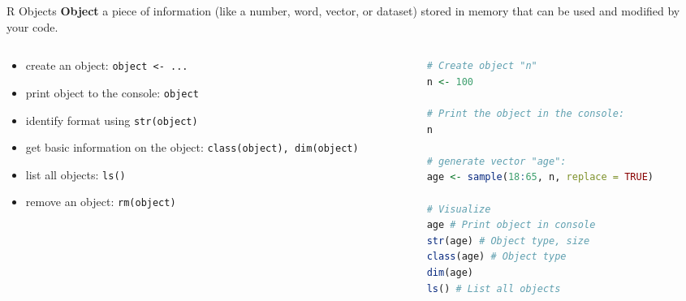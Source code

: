 \documentclass[9pt,aspectratio=169]{beamer}
\begin{document}
\begin{frame}[fragile]{R Objects}
\textbf{Object} a piece of information (like a number, word, vector, or dataset) stored in memory that can be used and modified by your code.
\pause
\begin{columns}
  \begin{column}{0.5\textwidth}
      \begin{itemize}
          \item create an object: \texttt{object <- ...}
          \item print object to the console: \texttt{object}
          \item identify format using \texttt{str(object)}
          \item get basic information on the object:  \texttt{class(object), dim(object)}
          \item list all objects: \texttt{ls()}
          \item remove an object: \texttt{rm(object)}
      \end{itemize}
  \end{column}
  \begin{column}{0.5\textwidth}
\begin{lstlisting}[language=R, basicstyle=\ttfamily\tiny]
# Create object "n"
n <- 100

# Print the object in the console:
n

# generate vector "age":
age <- sample(18:65, n, replace = TRUE)

# Visualize
age # Print object in console
str(age) # Object type, size
class(age) # Object type
dim(age)
ls() # List all objects
\end{lstlisting}
  \end{column}
\end{columns}

\end{frame}
\end{document}

